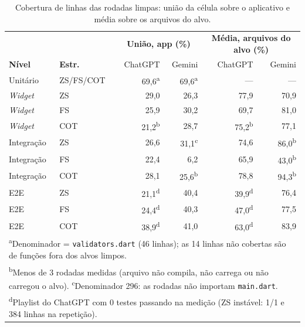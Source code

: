\documentclass[12pt]{article}
\begin{document}
\begin{table}[H]
\centering
\caption{Cobertura de linhas das rodadas limpas: união da célula sobre o aplicativo e média sobre os arquivos do alvo.}
\label{tab:cobertura}
\small
\begin{tabular}{llrrrr}
\toprule
& & \multicolumn{2}{c}{\textbf{União, app (\%)}} & \multicolumn{2}{c}{\textbf{Média, arquivos do alvo (\%)}} \\
\textbf{Nível} & \textbf{Estr.} & ChatGPT & Gemini & ChatGPT & Gemini \\
\midrule
Unitário   & ZS/FS/COT & 69,6\textsuperscript{a} & 69,6\textsuperscript{a} & --- & --- \\
\textit{Widget} & ZS  & 29,0 & 26,3 & 77,9 & 70,9 \\
\textit{Widget} & FS  & 25,9 & 30,2 & 69,7 & 81,0 \\
\textit{Widget} & COT & 21,2\textsuperscript{b} & 28,7 & 75,2\textsuperscript{b} & 77,1 \\
Integração & ZS  & 26,6 & 31,1\textsuperscript{c} & 74,6 & 86,0\textsuperscript{b} \\
Integração & FS  & 22,4 & 6,2  & 65,9 & 43,0\textsuperscript{b} \\
Integração & COT & 28,1 & 25,6\textsuperscript{b} & 78,8 & 94,3\textsuperscript{b} \\
E2E        & ZS  & 21,1\textsuperscript{d} & 40,4 & 39,9\textsuperscript{d} & 76,4 \\
E2E        & FS  & 24,4\textsuperscript{d} & 40,3 & 47,0\textsuperscript{d} & 77,5 \\
E2E        & COT & 38,9\textsuperscript{d} & 41,0 & 63,0\textsuperscript{d} & 83,9 \\
\bottomrule
\multicolumn{6}{p{14.5cm}}{\footnotesize \textsuperscript{a}Denominador = \texttt{validators.dart} (46 linhas); as 14 linhas não cobertas são de funções fora dos alvos limpos.} \\
\multicolumn{6}{p{14.5cm}}{\footnotesize \textsuperscript{b}Menos de 3 rodadas medidas (arquivo não compila, não carrega ou não carregou o alvo). \textsuperscript{c}Denominador 296: as rodadas não importam \texttt{main.dart}.} \\
\multicolumn{6}{p{14.5cm}}{\footnotesize \textsuperscript{d}Playlist do ChatGPT com 0 testes passando na medição (ZS instável: 1/1 e 384 linhas na repetição).} \\
\end{tabular}
\end{table}
\end{document}
